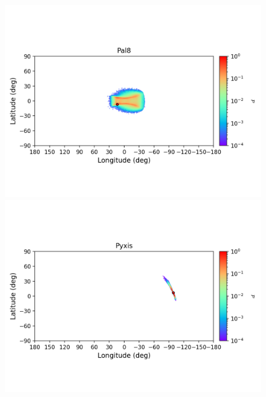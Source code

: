 \begin{figure}
\begin{center}
                \includegraphics[clip=true, trim = 0mm 20mm 0mm 10mm, width=1\columnwidth]{images/error_plots_Pal8.png}
                \includegraphics[clip=true, trim = 0mm 20mm 0mm 10mm, width=1\columnwidth]{images/error_plots_Pyxis.png}
                

\end{center}
\end{figure}
